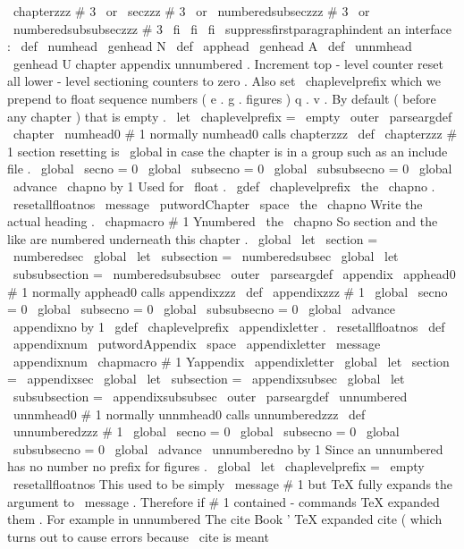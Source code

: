{{\
chapterzzz
{
#
3
}
%
\
or
\
seczzz
{
#
3
}
%
\
or
\
numberedsubseczzz
{
#
3
}
%
\
or
\
numberedsubsubseczzz
{
#
3
}
%
\
fi
\
fi
\
fi
\
suppressfirstparagraphindent
}
%
an
interface
:
\
def
\
numhead
{
\
genhead
N
}
\
def
\
apphead
{
\
genhead
A
}
\
def
\
unnmhead
{
\
genhead
U
}
%
chapter
appendix
unnumbered
.
Increment
top
-
level
counter
reset
%
all
lower
-
level
sectioning
counters
to
zero
.
%
%
Also
set
\
chaplevelprefix
which
we
prepend
to
float
sequence
numbers
%
(
e
.
g
.
figures
)
q
.
v
.
By
default
(
before
any
chapter
)
that
is
empty
.
\
let
\
chaplevelprefix
=
\
empty
%
\
outer
\
parseargdef
\
chapter
{
\
numhead0
{
#
1
}
}
%
normally
numhead0
calls
chapterzzz
\
def
\
chapterzzz
#
1
{
%
%
section
resetting
is
\
global
in
case
the
chapter
is
in
a
group
such
%
as
an
include
file
.
\
global
\
secno
=
0
\
global
\
subsecno
=
0
\
global
\
subsubsecno
=
0
\
global
\
advance
\
chapno
by
1
%
%
Used
for
\
float
.
\
gdef
\
chaplevelprefix
{
\
the
\
chapno
.
}
%
\
resetallfloatnos
%
\
message
{
\
putwordChapter
\
space
\
the
\
chapno
}
%
%
%
Write
the
actual
heading
.
\
chapmacro
{
#
1
}
{
Ynumbered
}
{
\
the
\
chapno
}
%
%
%
So
section
and
the
like
are
numbered
underneath
this
chapter
.
\
global
\
let
\
section
=
\
numberedsec
\
global
\
let
\
subsection
=
\
numberedsubsec
\
global
\
let
\
subsubsection
=
\
numberedsubsubsec
}
\
outer
\
parseargdef
\
appendix
{
\
apphead0
{
#
1
}
}
%
normally
apphead0
calls
appendixzzz
\
def
\
appendixzzz
#
1
{
%
\
global
\
secno
=
0
\
global
\
subsecno
=
0
\
global
\
subsubsecno
=
0
\
global
\
advance
\
appendixno
by
1
\
gdef
\
chaplevelprefix
{
\
appendixletter
.
}
%
\
resetallfloatnos
%
\
def
\
appendixnum
{
\
putwordAppendix
\
space
\
appendixletter
}
%
\
message
{
\
appendixnum
}
%
%
\
chapmacro
{
#
1
}
{
Yappendix
}
{
\
appendixletter
}
%
%
\
global
\
let
\
section
=
\
appendixsec
\
global
\
let
\
subsection
=
\
appendixsubsec
\
global
\
let
\
subsubsection
=
\
appendixsubsubsec
}
\
outer
\
parseargdef
\
unnumbered
{
\
unnmhead0
{
#
1
}
}
%
normally
unnmhead0
calls
unnumberedzzz
\
def
\
unnumberedzzz
#
1
{
%
\
global
\
secno
=
0
\
global
\
subsecno
=
0
\
global
\
subsubsecno
=
0
\
global
\
advance
\
unnumberedno
by
1
%
%
Since
an
unnumbered
has
no
number
no
prefix
for
figures
.
\
global
\
let
\
chaplevelprefix
=
\
empty
\
resetallfloatnos
%
%
This
used
to
be
simply
\
message
{
#
1
}
but
TeX
fully
expands
the
%
argument
to
\
message
.
Therefore
if
#
1
contained
-
commands
TeX
%
expanded
them
.
For
example
in
unnumbered
The
cite
{
Book
}
'
TeX
%
expanded
cite
(
which
turns
out
to
cause
errors
because
\
cite
is
meant
}}
